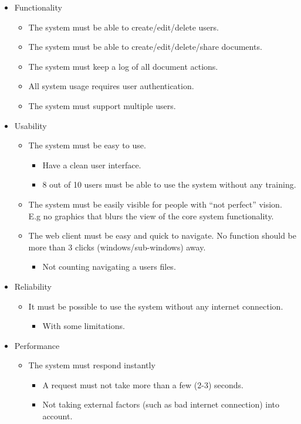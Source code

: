 \documentclass[11pt]{article}
\begin{document}
\begin{itemize}
\item Functionality
\begin{itemize}
\item The system must be able to create/edit/delete users.
\item The system must be able to create/edit/delete/share documents.
\item The system must keep a log of all document actions.
\item All system usage requires user authentication.
\item The system must support multiple users.
\end{itemize}
\item Usability
\begin{itemize}
\item The system must be easy to use.
\begin{itemize}
\item Have a clean user interface.
\item 8 out of 10 users must be able to use the system without any training.
\end{itemize}
\item The system must be easily visible for people with ``not perfect'' vision. 
       E.g no graphics that blurs the view of the core system functionality.
\item The web client must be easy and quick to navigate. No function should 
       be more than 3 clicks (windows/sub-windows) away.
\begin{itemize}
\item Not counting navigating a users files.
\end{itemize}
\end{itemize}
\item Reliability
\begin{itemize}
\item It must be possible to use the system without any internet connection.
\begin{itemize}
\item With some limitations.
\end{itemize}
\end{itemize}
\item Performance
\begin{itemize}
\item The system must respond instantly
\begin{itemize}
\item A request must not take more than a few (2-3) seconds.
\item Not taking external factors (such as bad internet connection) into account.
\end{itemize}
\end{itemize}
\end{itemize}
\end{document}
